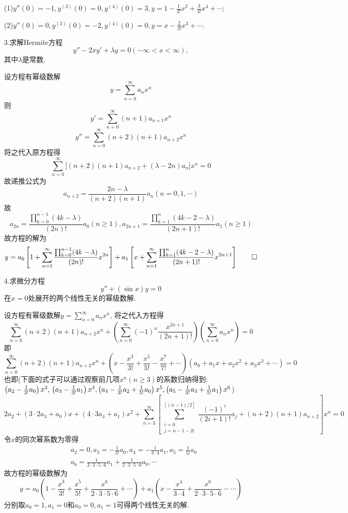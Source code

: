 \begin{solve}
(1)$y''(0)=-1,y^{(3)}(0)=0,y^{(4)}(0)=3,y=1-\frac{1}{2!}x^2+\frac{3}{4!}x^4+\cdots$;

(2)$y''(0)=0,y^{(3)}(0)=-2,y^{(4)}(0)=0,y=x-\frac{2}{3!}x^3+\cdots$.
\end{solve}


3.求解Hermite方程
\[y''-2xy'+\lambda y=0(-\infty<x<\infty),\]
其中$\lambda$是常数.

\begin{solve} 设方程有幂级数解\[y=\sum_{n=0}^{\infty}a_nx^n\] 则
\[y'=\sum_{n=0}^{\infty}(n+1)a_{n+1}x^n\]
\[y''=\sum_{n=0}^{\infty}(n+2)(n+1)a_{n+2}x^n\]
将之代入原方程得
\[\sum_{n=0}^{\infty}\big[(n+2)(n+1)a_{n+2}+(\lambda-2n)a_n\big]x^n=0\]
故递推公式为
\[a_{n+2}=\frac{2n-\lambda}{(n+2)(n+1)}a_n(n=0,1,\cdots)\]
故\[a_{2n}=\frac{\prod_{k=0}^{n-1}(4k-\lambda)}{(2n)!}a_0(n\geq1),a_{2n+1}=\frac{\prod_{k=1}^n(4k-2-\lambda)}{(2n+1)!}a_1(n\geq1)\]
故方程的解为
\[y=a_0\left[1+\sum_{n=1}^{\infty}\frac{\prod_{k=0}^{n-1}(4k-\lambda)}{(2n)!}x^{2n}\right]+a_1\left[x+\sum_{n=1}^{\infty}\frac{\prod_{k=1}^n(4k-2-\lambda)}{(2n+1)!}x^{2n+1}\right]\qedhere\]
\end{solve}


4.求微分方程
\[y''+(\sin x)y=0\]
在$x=0$处展开的两个线性无关的幂级数解.

\begin{solve}
设方程有幂级数解$y=\sum_{n=0}^{\infty}a_nx^n$, 将之代入方程得
\[\sum_{n=0}^{\infty}(n+2)(n+1)a_{n+2}x^n+\left(\sum_{n=0}^{\infty}(-1)^n\frac{x^{2n+1}}{(2n+1)!}\right)\left(\sum_{n=0}^{\infty}a_nx^n\right)=0\]
即
\[\sum_{n=0}^{\infty}(n+2)(n+1)a_{n+2}x^n+\left(x-\frac{x^3}{3!}+\frac{x^5}{5!}-\frac{x^7}{7!}+\cdots\right)\left(a_0+a_1x+a_2x^2+a_3x^3+\cdots\right)=0\]
也即(下面的式子可以通过观察前几项$x^n(n\geq3)$的系数归纳得到: $\left(a_2-\frac{1}{3!}a_0\right)x^3,\\\left(a_3-\frac{1}{3!}a_1\right)x^4,\left(a_4-\frac{1}{3!}a_2+\frac{1}{5!}a_0\right)x^5,\left(a_5-\frac{1}{3!}a_3+\frac{1}{5!}a_1\right)x^6$)
\[2a_2+(3\cdot2a_3+a_0)x+(4\cdot3a_4+a_1)x^2+\sum_{n=3}^{\infty}\left[\sum_{\substack{i=0\\j=n-1-2i}}^{[(n-1)/2]}\frac{(-1)^i}{(2i+1)!}a_j+(n+2)(n+1)a_{n+2}\right]x^n=0\]
令$x$的同次幂系数为零得
\[\begin{split}&a_2=0,a_3=-\frac{1}{3!}a_0,a_4=-\frac{1}{3\cdot4}a_1,a_5=\frac{1}{5!}a_0\\
&a_6=\frac{1}{2\cdot3\cdot5\cdot6}a_1+\frac{1}{2\cdot3\cdot5\cdot6}a_0,\cdots\end{split}\]
故方程的幂级数解为
\[y=a_0\left(1-\frac{x^3}{3!}+\frac{x^5}{5!}+\frac{x^6}{2\cdot3\cdot5\cdot6}+\cdots\right)+a_1\left(x-\frac{x^4}{3\cdot4}+\frac{x^6}{2\cdot3\cdot5\cdot6}-\cdots\right)\]
分别取$a_0=1,a_1=0$和$a_0=0,a_1=1$可得两个线性无关的解.
\end{solve}


